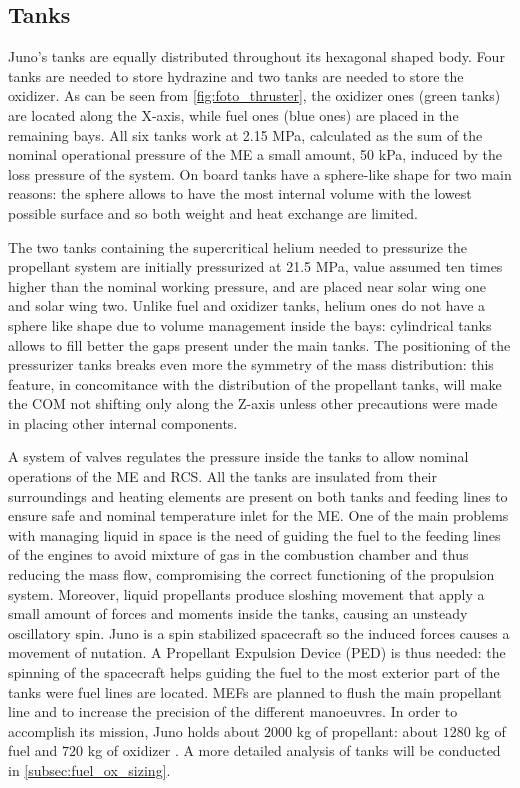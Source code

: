 
\subsection{Tanks} 
\label{subsec:tanks}
Juno's tanks are equally distributed throughout its hexagonal shaped body. Four tanks are needed to store hydrazine and two tanks are needed to store the oxidizer. As can be seen from \autoref{fig:foto_thruster}, the oxidizer ones (green tanks) are located along the X-axis, while fuel ones (blue ones) are placed in the remaining bays. All six tanks work at 2.15 MPa, calculated as the sum of the nominal operational pressure of the ME a small amount, 50 kPa, induced by the loss pressure of the system\cite{Leros}. On board tanks have a sphere-like shape for two main reasons: the sphere allows to have the most internal volume with the lowest possible surface and so both weight and heat exchange are limited.

The two tanks\cite{2tankshe} containing the supercritical helium needed to pressurize the propellant system are initially pressurized at 21.5 MPa, value assumed ten times higher than the nominal working pressure, and are placed near solar wing one and solar wing two. Unlike fuel and oxidizer tanks, helium ones do not have a sphere like shape due to volume management inside the bays\cite{he_tank}: cylindrical tanks allows to fill better the gaps present under the main tanks. The positioning of the pressurizer tanks breaks even more the symmetry of the mass distribution: this feature, in concomitance with the distribution of the propellant tanks, will make the COM not shifting only along the Z-axis unless other precautions were made in placing other internal components. 

A system of valves regulates the pressure inside the tanks to allow nominal operations of the ME and RCS. All the tanks are insulated from their surroundings and heating elements are present on both tanks and feeding lines to ensure safe and nominal temperature inlet for the ME\cite{Leros}.
One of the main problems with managing liquid in space is the need of guiding the fuel to the feeding lines of the engines to avoid mixture of gas in the combustion chamber and thus reducing the mass flow, compromising the correct functioning of the propulsion system. Moreover, liquid propellants produce sloshing movement that apply a small amount of forces and moments inside the tanks, causing an unsteady oscillatory spin. Juno is a spin stabilized spacecraft so the induced forces causes a movement of nutation. A Propellant Expulsion Device (PED) is thus needed: the spinning of the spacecraft helps guiding the fuel to the most exterior part of the tanks were fuel lines are located\cite{slosh}.
MEFs are planned to flush the main propellant line and to increase the precision of the different manoeuvres.
In order to accomplish its mission, Juno holds about $2000$ kg of propellant: about $1280$ kg of fuel and $720$ kg of oxidizer \cite{juno_inner}. A more detailed analysis of tanks will be conducted in \autoref{subsec:fuel_ox_sizing}.